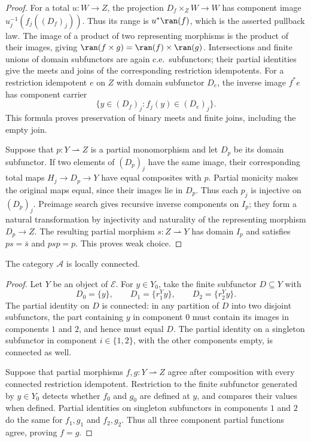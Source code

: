 \begin{proof}
For a total $u:W\to Z$, the projection
$D_f\times_Z W\to W$ has component image
$u_j^{-1}(f_j((D_f)_j))$. Thus its range is $u^*\ran(f)$,
which is the asserted pullback law. The image of a product
of two representing morphisms is the product of their images, giving
$\ran(f\times g)=\ran(f)\times\ran(g)$.
Intersections and finite unions of domain subfunctors are again
c.e.\ subfunctors; their partial identities give the meets and joins
of the corresponding restriction idempotents. For a restriction idempotent
$e$ on $Z$ with domain subfunctor $D_e$, the inverse image $f^*e$
has component carrier
\[
 \{y\in(D_f)_j:f_j(y)\in(D_e)_j\}.
\]
This formula proves preservation of binary meets and finite joins,
including the empty join.

Suppose that $p:Y\rightharpoonup Z$ is a partial monomorphism
and let $D_p$ be its domain subfunctor. If two elements of $(D_p)_j$
have the same image, their corresponding total maps
$H_j\to D_p\to Y$ have equal composites with $p$.
Partial monicity makes the original maps equal, since their
images lie in $D_p$. Thus each $p_j$ is injective on $(D_p)_j$.
Preimage search gives recursive inverse components on $I_p$;
they form a natural transformation by injectivity and naturality of
the representing morphism $D_p\to Z$.
The resulting partial morphism $s:Z\rightharpoonup Y$ has domain
$I_p$ and satisfies $ps=\bar s$ and $psp=p$.
This proves weak choice.
\end{proof}

\begin{proposition}\label{prop:fork-local}
The category $\mathcal A$ is locally connected.
\end{proposition}
\begin{proof}
Let $Y$ be an object of $\mathcal E$. For $y\in Y_0$, take the
finite subfunctor $D\subseteq Y$ with
\[
 D_0=\{y\},\qquad D_1=\{r_1^Yy\},\qquad D_2=\{r_2^Yy\}.
\]
The partial identity on $D$ is connected: in any partition of $D$
into two disjoint subfunctors, the part containing $y$ in component
$0$ must contain its images in components $1$ and $2$, and hence
must equal $D$. The partial identity on a singleton subfunctor
in component $i\in\{1,2\}$, with the other components empty,
is connected as well.

Suppose that partial morphisms $f,g:Y\rightharpoonup Z$ agree
after composition with every connected restriction idempotent.
Restriction to the
finite subfunctor generated by $y\in Y_0$ detects whether
$f_0$ and $g_0$ are defined at $y$, and compares their values
when defined. Partial identities on singleton subfunctors in
components $1$ and $2$ do the same for $f_1,g_1$ and $f_2,g_2$.
Thus all three component partial functions agree, proving $f=g$.
\end{proof}

